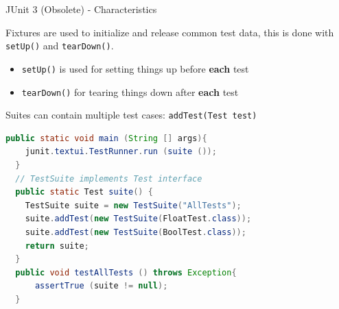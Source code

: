 \documentclass[11pt, xcolor=svgnames]{beamer}
\begin{document}
\begin{frame}[fragile]{JUnit 3 (Obsolete) - Characteristics}

  Fixtures are used to initialize and release common test data, this is done with \texttt{setUp()} and \texttt{tearDown()}.

  \begin{itemize}
    \item \texttt{setUp()} is used for setting things up before \textbf{each} test
    \item \texttt{tearDown()} for tearing things down after \textbf{each} test
  \end{itemize}
  
  Suites can contain multiple test cases: \texttt{addTest(Test test)}

\begin{lstlisting}[language=JAVA,basicstyle=\scriptsize]
  public static void main (String [] args){
    junit.textui.TestRunner.run (suite ());
  }
  // TestSuite implements Test interface
  public static Test suite() {
    TestSuite suite = new TestSuite("AllTests");
    suite.addTest(new TestSuite(FloatTest.class));
    suite.addTest(new TestSuite(BoolTest.class));
    return suite;
  }
  public void testAllTests () throws Exception{
      assertTrue (suite != null);
  }
  \end{lstlisting}

\end{frame}


\end{document}
